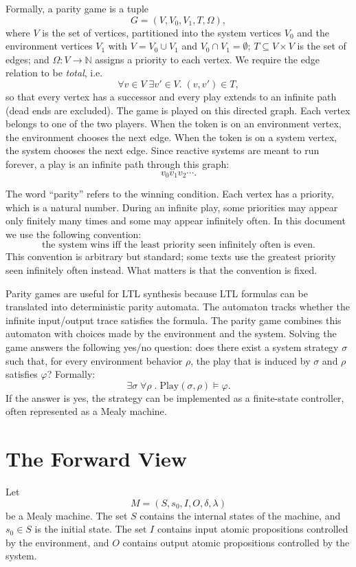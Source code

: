 \documentclass[11pt]{article}
\theoremstyle{remark}
\newcommand{\Nat}{\mathbb{N}}
\begin{document}
Formally, a parity game is a tuple
\[
  G = (V, V_0, V_1, T, \Omega),
\]
where \(V\) is the set of vertices, partitioned into the system vertices
\(V_0\) and the environment vertices \(V_1\) with \(V=V_0\cup V_1\) and
\(V_0\cap V_1=\emptyset\); \(T\subseteq V\times V\) is the set of edges; and
\(\Omega:V\to\Nat\) assigns a priority to each vertex. We require the edge
relation to be \emph{total}, i.e.
\[
  \forall v\in V\;\exists v'\in V.\;(v,v')\in T,
\]
so that every vertex has a successor and every play extends to an infinite path
(dead ends are excluded).
The game is played on this directed graph. Each vertex belongs to one of the two
players. When the token is on an environment vertex, the environment chooses the
next edge. When the token is on a system vertex, the system chooses the next
edge. Since reactive systems are meant to run forever, a play is an infinite
path through this graph:
\[
  v_0 v_1 v_2 \cdots .
\]

The word ``parity'' refers to the winning condition. Each vertex has a priority,
which is a natural number. During an infinite play, some priorities may appear
only finitely many times and some may appear infinitely often. In this document
we use the following convention:
\[
  \text{the system wins iff the least priority seen infinitely often is even.}
\]
This convention is arbitrary but standard; some texts use the greatest priority
seen infinitely often instead. What matters is that the convention is fixed.

Parity games are useful for LTL synthesis because LTL formulas can be translated
into deterministic parity automata. The automaton tracks whether the infinite
input/output trace satisfies the formula. The parity game combines this
automaton with choices made by the environment and the system. Solving the game
answers the following yes/no question: does there exist a system strategy
\(\sigma\) such that, for every environment behavior \(\rho\), the play that is
induced by \(\sigma\) and \(\rho\) satisfies \(\varphi\)? Formally:
\[
  \exists \sigma\;\forall \rho\;.\;
  \mathrm{Play}(\sigma,\rho)\models \varphi .
\]
If the answer is yes, the strategy can be implemented as a finite-state
controller, often represented as a Mealy machine.

\section{The Forward View}

Let
\[
  M = (S,s_0,I,O,\delta,\lambda)
\]
be a Mealy machine. The set \(S\) contains the internal states of the machine,
and \(s_0\in S\) is the initial state. The set \(I\) contains input atomic
propositions controlled by the environment, and \(O\) contains output atomic
propositions controlled by the system.
\end{document}
